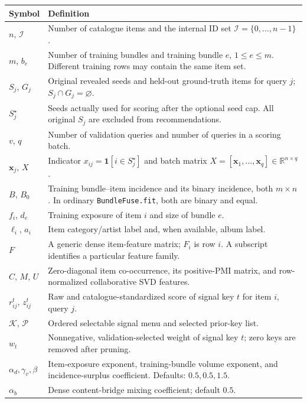 \documentclass[11pt,a4paper]{article}
\newcommand{\code}[1]{\nolinkurl{#1}}
\newcommand{\R}{\mathbb R}
\newcommand{\I}{\mathcal I}
\numberwithin{equation}{section}
\begin{document}
\begin{longtable}{@{}>{\raggedright\arraybackslash}p{.21\linewidth}>{\raggedright\arraybackslash}p{.73\linewidth}@{}}
\toprule Symbol & Definition \\\midrule\endhead
$n$, $\I$ & Number of catalogue items and the internal ID set $\I=\{0,\ldots,n-1\}$. \\
$m$, $b_e$ & Number of training bundles and training bundle $e$, $1\le e\le m$. Different training rows may contain the same item set. \\
$S_j$, $G_j$ & Original revealed seeds and held-out ground-truth items for query $j$; $S_j\cap G_j=\varnothing$. \\
$S_j^\star$ & Seeds actually used for scoring after the optional seed cap. All original $S_j$ are excluded from recommendations. \\
$v$, $q$ & Number of validation queries and number of queries in a scoring batch. \\
$\bm x_j$, $X$ & Indicator $x_{ij}=\mathbf 1[i\in S_j^\star]$ and batch matrix $X=[\bm x_1,\ldots,\bm x_q]\in\R^{n\times q}$. \\
$B$, $B_0$ & Training bundle--item incidence and its binary incidence, both $m\times n$. In ordinary \code{BundleFuse.fit}, both are binary and equal. \\
$f_i$, $d_e$ & Training exposure of item $i$ and size of bundle $e$. \\
$\ell_i$, $a_i$ & Item category/artist label and, when available, album label. \\
$F$ & A generic dense item-feature matrix; $F_i$ is row $i$. A subscript identifies a particular feature family. \\
$C$, $M$, $U$ & Zero-diagonal item co-occurrence, its positive-PMI matrix, and row-normalized collaborative SVD features. \\
$r^t_{ij}$, $z^t_{ij}$ & Raw and catalogue-standardized score of signal key $t$ for item $i$, query $j$. \\
$\mathcal K$, $\mathcal P$ & Ordered selectable signal menu and selected prior-key list. \\
$w_t$ & Nonnegative, validation-selected weight of signal key $t$; zero keys are removed after pruning. \\
$\alpha_d,\gamma_v,\beta$ & Item-exposure exponent, training-bundle volume exponent, and incidence-surplus coefficient. Defaults: $0.5,0.5,1.5$. \\
$\alpha_b$ & Dense content-bridge mixing coefficient; default $0.5$. \\

\end{longtable}
\end{document}
